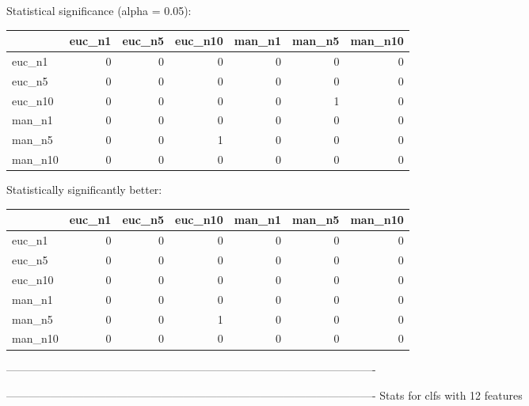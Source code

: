 Statistical significance (alpha = 0.05):
 \begin{tabular}{lrrrrrr}
\hline
         &   euc\_n1 &   euc\_n5 &   euc\_n10 &   man\_n1 &   man\_n5 &   man\_n10 \\
\hline
 euc\_n1  &        0 &        0 &         0 &        0 &        0 &         0 \\
 euc\_n5  &        0 &        0 &         0 &        0 &        0 &         0 \\
 euc\_n10 &        0 &        0 &         0 &        0 &        1 &         0 \\
 man\_n1  &        0 &        0 &         0 &        0 &        0 &         0 \\
 man\_n5  &        0 &        0 &         1 &        0 &        0 &         0 \\
 man\_n10 &        0 &        0 &         0 &        0 &        0 &         0 \\
\hline
\end{tabular} 

Statistically significantly better:
 \begin{tabular}{lrrrrrr}
\hline
         &   euc\_n1 &   euc\_n5 &   euc\_n10 &   man\_n1 &   man\_n5 &   man\_n10 \\
\hline
 euc\_n1  &        0 &        0 &         0 &        0 &        0 &         0 \\
 euc\_n5  &        0 &        0 &         0 &        0 &        0 &         0 \\
 euc\_n10 &        0 &        0 &         0 &        0 &        0 &         0 \\
 man\_n1  &        0 &        0 &         0 &        0 &        0 &         0 \\
 man\_n5  &        0 &        0 &         1 &        0 &        0 &         0 \\
 man\_n10 &        0 &        0 &         0 &        0 &        0 &         0 \\
\hline
\end{tabular} 

----------------------------------------------------------------------------------------------------



----------------------------------------------------------------------------------------------------
Stats for clfs with 12 features



